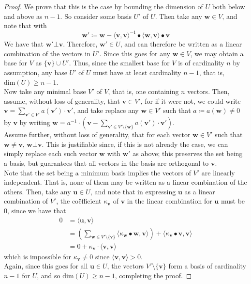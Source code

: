 	\begin{proof}
		We prove that this is the case by bounding the dimension of $U$ both below and 
		above as $n-1$. So consider some basis $U'$ of $U$. Then take any $\mathbf{w} \in 
		V$, and note that with
		$$
			\mathbf{w}' \coloneqq \mathbf{w} - 
			\langle\mathbf{v},\mathbf{v}\rangle^{-1} \bullet 
			\langle\mathbf{w},\mathbf{v}\rangle\bullet \mathbf{v}
		$$
		We have that $\mathbf{w}' \bot \mathbf{v}$. Therefore, $\mathbf{w}' \in U$, and 
		can therefore be written as a linear combination of the vectors in $U'$. Since 
		this goes for any $\mathbf{w} \in V$, we may obtain a base for $V$ as $\{
		\mathbf{v}\} \cup U'$. Thus, since the smallest base for $V$ is of cardinality $n$ 
		by assumption, any base $U'$ of $U$ must have at least cardinality $n-1$, that is, 
		$\mathrm{dim} (U) \geq n-1$. \\
		Now take any minimal base $V'$ of $V$, that is, one containing $n$ vectors. Then,
		assume, without loss of generality, that $\mathbf{v} \in V'$, for if it were not, 
		we could write $\mathbf{v} = \sum_{\mathbf{v'} \in V'} a(\mathbf{v}') \cdot 
		\mathbf{v}'$, and take replace any $\mathbf{w} \in V'$ such that $a \coloneqq 
		a(\mathbf{w}) \neq 0$ by $\mathbf{v}$ by writing  $\mathbf{w} = a^{-1} \cdot 
		\left(\mathbf{v}- \sum_{\mathbf{v}' \in V'\setminus{\{\mathbf{w}\}}}a(\mathbf{v}') 
		\cdot\mathbf{v}'\right)$.\\ 
		Assume further, without loss of generality, that for each vector $\mathbf{w}\in V'$
		such that $\mathbf{w} \neq \mathbf{v}$, $\mathbf{w} \bot \mathbf{v}$. This is 
		justifiable since, if this is not already the case, we can simply replace each 
		such vector $\mathbf{w}$ with $\mathbf{w}'$ as above; this preserves the set being 
		a basis, but guarantees that all vectors in the basis are orthogonal to 
		$\mathbf{v}$. \\
		Note that the set being a minimum basis implies the vectors of $V'$ are linearly 
		independent. That is, none of them may be written as a linear combination of the 
		others. Then, take any $\mathbf{u}\in U$, and note that in expressing $\mathbf{u}$ 
		as a linear combination of $V'$, the co\"efficient $\kappa_\mathbf{v}$ of 
		$\mathbf{v}$ in the linear combination for $\mathbf{u}$ must be $0$, since we have 
		that
		\begin{align*}
			0 &= \langle \mathbf{u}, \mathbf{v} \rangle \\
			 &= \left(\sum_{\mathbf{w}\in V' \setminus\{\mathbf{v}\}}
			\langle \kappa_\mathbf{w}\bullet\mathbf{w},\mathbf{v}\rangle\right) + 
			 \langle \kappa_\mathbf{v} \bullet \mathbf{v} , \mathbf{v} \rangle \\
			&= 0 + \kappa_\mathbf{v} \cdot \langle \mathbf{v} , \mathbf{v} \rangle
		\end{align*}
		which is impossible for $\kappa_\mathbf{v} \neq 0$ since $\langle\mathbf{v},
		\mathbf{v}\rangle > 0$. \\
		Again, since this goes for all $\mathbf{u} \in U$, the vectors $V' \setminus 
		\{\mathbf{v}\}$ form a basis of cardinality $n-1$ for $U$, and so $\mathrm{dim}(U) 
		\geq n-1$, completing the proof.
	\end{proof}
